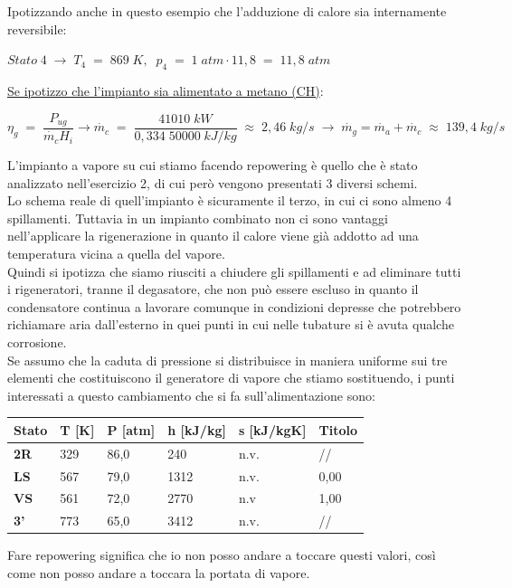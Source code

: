 \documentclass[a4paper, twoside, 12pt]{report}
\begin{document}
Ipotizzando anche in questo esempio che l'adduzione di calore sia internamente reversibile:
\begin{center}
	$Stato\;4\;\to\;T_{4}\;=\;869\;K,\;\;p_{4}\;=\;1\;atm\cdot11,8\;=\;11,8\;atm$
\end{center}
\uline{Se ipotizzo che l'impianto sia alimentato a metano (CH)}:
\begin{center}
	$\eta_{g}\;=\;\dfrac{P_{ug}}{\dot{m_{c}}H_{i}}\to\dot{m_{c}}\;=\;\dfrac{41010\;kW}{0,334\;50000\;kJ/kg}\;\approx\;2,46\;kg/s\;\to\;\dot{m_{g}}=\dot{m_{a}}+\dot{m_{c}}\;\approx\;139,4\;kg/s$
\end{center}	
L'impianto a vapore su cui stiamo facendo repowering è quello che è stato analizzato nell'esercizio 2, di cui però vengono presentati 3 diversi schemi.\\
Lo schema reale di quell'impianto è sicuramente il terzo, in cui ci sono almeno 4 spillamenti. Tuttavia in un impianto combinato non ci sono vantaggi nell'applicare la rigenerazione in quanto il calore viene già addotto ad una temperatura vicina a quella del vapore.\\
Quindi si ipotizza che siamo riusciti a chiudere gli spillamenti e ad eliminare tutti i rigeneratori, tranne il degasatore, che non può essere escluso in quanto il condensatore continua a lavorare comunque in condizioni depresse che potrebbero richiamare aria dall'esterno in quei punti in cui nelle tubature si è avuta qualche corrosione.\\
Se assumo che la caduta di pressione si distribuisce in maniera uniforme sui tre elementi che costituiscono il generatore di vapore che stiamo sostituendo, i punti interessati a questo cambiamento che si fa sull'alimentazione sono:
\begin{center}
	\begin{tabular}{| l || l | l | l | l | l |}
		\hline
		\textbf{Stato} & \textbf{T [K]} & \textbf{P [atm]} & \textbf{h [kJ/kg]} & \textbf{s [kJ/kgK]} & \textbf{Titolo}\\ 
		\hline
		\textbf{2R} & 329 & 86,0 & 240 & n.v. & //\\
		\hline
		\textbf{LS} & 567 & 79,0 & 1312 & n.v. & 0,00\\
		\hline
		\textbf{VS} & 561 & 72,0 & 2770 & n.v & 1,00\\
		\hline
		\textbf{3'} & 773 & 65,0 & 3412 & n.v. & //\\
		\hline
	\end{tabular}
\end{center} 
Fare repowering significa che io non posso andare a toccare questi valori, così come non posso andare a toccara la portata di vapore.
\end{document}
